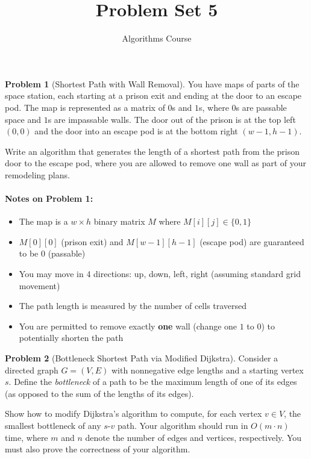 \documentclass[12pt,a4paper]{article}
\title{\textbf{Problem Set 5}}
\author{Algorithms Course}
\date{}
\theoremstyle{plain}
\theoremstyle{definition}
\newtheorem{problem}{Problem}
\theoremstyle{remark}
\begin{document}
\maketitle

\begin{problem}[Shortest Path with Wall Removal]
You have maps of parts of the space station, each starting at a prison exit and ending at the door to an escape pod. The map is represented as a matrix of $0$s and $1$s, where $0$s are passable space and $1$s are impassable walls. The door out of the prison is at the top left $(0,0)$ and the door into an escape pod is at the bottom right $(w-1,h-1)$.

Write an algorithm that generates the length of a shortest path from the prison door to the escape pod, where you are allowed to remove one wall as part of your remodeling plans.
\end{problem}

\paragraph{Notes on Problem 1:}
\begin{itemize}
    \item The map is a $w \times h$ binary matrix $M$ where $M[i][j] \in \{0, 1\}$
    \item $M[0][0]$ (prison exit) and $M[w-1][h-1]$ (escape pod) are guaranteed to be $0$ (passable)
    \item You may move in 4 directions: up, down, left, right (assuming standard grid movement)
    \item The path length is measured by the number of cells traversed
    \item You are permitted to remove exactly \textbf{one} wall (change one $1$ to $0$) to potentially shorten the path
\end{itemize}

\vspace{1em}

\begin{problem}[Bottleneck Shortest Path via Modified Dijkstra]
Consider a directed graph $G = (V, E)$ with nonnegative edge lengths and a starting vertex $s$. Define the \emph{bottleneck} of a path to be the maximum length of one of its edges (as opposed to the sum of the lengths of its edges).

Show how to modify Dijkstra's algorithm to compute, for each vertex $v \in V$, the smallest bottleneck of any $s$-$v$ path. Your algorithm should run in $O(m \cdot n)$ time, where $m$ and $n$ denote the number of edges and vertices, respectively. You must also prove the correctness of your algorithm.
\end{problem}
\end{document}
